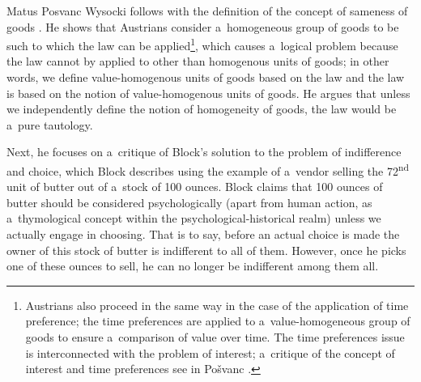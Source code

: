 \begin{artengenv}{Matus Posvanc}
Wysocki follows with the definition of the concept of sameness of goods 
\parencite[][pp.16, 20–21]{Wysocki2021problem}. %
 He shows that Austrians consider a~homogeneous group of goods to be such to which the law can be applied\footnote{Austrians also proceed in the same way in the case of the application of time preference; the time preferences are applied to a~value-homogeneous group of goods to ensure a~comparison of value over time. The time preferences issue is interconnected with the problem of interest; a~critique of the concept of interest and time preferences see in Pošvanc 
\parencite*[][]{Posvanc2019Evolutionary}.%
}, which causes a~logical problem because the law cannot by applied to other than homogenous units of goods; in other words, we define value-homogenous units of goods based on the law and the law is based on the notion of value-homogenous units of goods. He argues that unless we independently define the notion of homogeneity of goods, the law would be a~pure tautology.



Next, he focuses on a~critique of Block's solution to the problem of indifference and choice, which Block 
\parencite*[][]{Block1980On} %
 describes using the example of a~vendor selling the 72\textsuperscript{nd} unit of butter out of a~stock of 100 ounces. Block 
\parencite*[][]{Block2009Rejoinder} %
 claims that 100 ounces of butter should be considered psychologically (apart from human action, as a~thymological concept within the psychological-historical realm) unless we actually engage in choosing. That is to say, before an actual choice is made the owner of this stock of butter is indifferent to all of them. However, once he picks one of these ounces to sell, he can no longer be indifferent among them all.




\end{artengenv}
